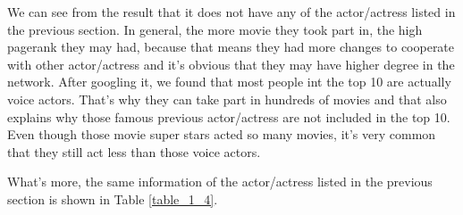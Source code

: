 \documentclass[11pt]{article}
\begin{document}
\begin{table}
\center
\caption{Top 10 highest pagerank score actor/actress}
\label{table_1_3}
\end{table}

We can see from the result that it does not have any of the actor/actress listed in the previous section. In general, the more movie they took part in, the high pagerank they may had, because that means they had more changes to cooperate with other actor/actress and it's obvious that they may have higher degree in the network. After googling it, we found that most people int the top 10 are actually voice actors. That's why they can take part in hundreds of movies and that also explains why those famous previous actor/actress are not included in the top 10. Even though those movie super stars acted so many movies, it's very common that they still act less than those voice actors.

What's more, the same information of the actor/actress listed in the previous section is shown in Table \ref{table_1_4}.
\end{document}
